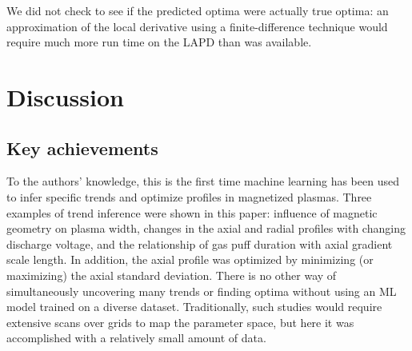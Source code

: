 We did not check to see if the predicted optima were actually true optima: an approximation of the local derivative using a finite-difference technique would require much more run time on the LAPD than was available. 

\section{Discussion}
\label{chp_isat_sec:discussion}


\subsection{Key achievements}

To the authors' knowledge, this is the first time machine learning has been used to infer specific trends and optimize profiles in magnetized plasmas. Three examples of trend inference were shown in this paper: influence of magnetic geometry on plasma width, changes in the axial and radial profiles with changing discharge voltage, and the relationship of gas puff duration with axial gradient scale length. In addition, the axial profile was optimized by minimizing (or maximizing) the axial standard deviation. There is no other way of simultaneously uncovering many trends or finding optima without using an ML model trained on a diverse dataset. Traditionally, such studies would require extensive scans over grids to map the parameter space, but here it was accomplished with a relatively small amount of data.


